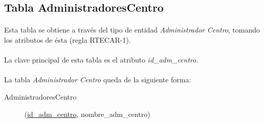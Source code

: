   \subsection{Tabla AdministradoresCentro}

      \paragraph{}Esta tabla se obtiene a través del tipo de entidad
      \textit{Administrador Centro}, tomando los atributos de ésta (regla
      RTECAR-1).

      \paragraph{}La clave principal de esta tabla es el atributo
      \textit{id\_adm\_centro}.

      \paragraph{}La tabla \textit{Administrador Centro} queda de la siguiente
      forma:

      \begin{description}
         \item[AdministradoresCentro] \begin{flushleft}(\underline{id\_adm\_centro},
         nombre\_adm\_centro)\end{flushleft}
      \end{description}

